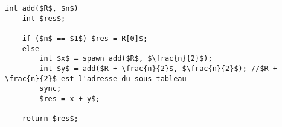 \begin{lstlisting}[mathescape, style=cilk, title=La somme récursive sur le tableau.]
int add($R$, $n$)
    int $res$;

    if ($n$ == $1$) $res = R[0]$;
    else
        int $x$ = spawn add($R$, $\frac{n}{2}$);
        int $y$ = add($R + \frac{n}{2}$, $\frac{n}{2}$); //$R + \frac{n}{2}$ est l'adresse du sous-tableau
        sync;
        $res = x + y$;
        
    return $res$;
\end{lstlisting}